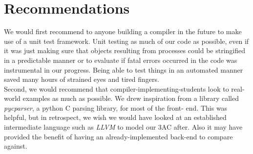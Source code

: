 \documentclass{article}
\begin{document}
\section{Recommendations}
\noindent We would first recommend to anyone building a compiler in the future to make
use of a unit test framework. Unit testing as much of our code as possible,
even if it was just making sure that objects resulting from processes could
be stringified in a predictable manner or to evaluate if fatal errors occurred
in the code was instrumental in our progress. Being able to test things in an
automated manner saved many hours of strained eyes and tired fingers.\\

\noindent Second, we would recommend that compiler-implementing-students look to
real-world examples as much as possible. We drew inspiration from a library
called \textit{pycparser}, a python C parsing library, for most of the front-
end. This was helpful, but in retrospect, we wish we would have looked at an
established intermediate language such as \textit{LLVM} to model our 3AC after.
Also it may have provided the benefit of having an already-implemented back-end
to compare against.
\end{document}
